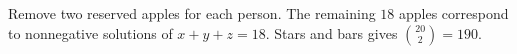 Remove two reserved apples for each person. The remaining $18$ apples correspond to nonnegative solutions of $x+y+z=18$. Stars and bars gives $\binom{20}{2}=\boxed{190}$.
